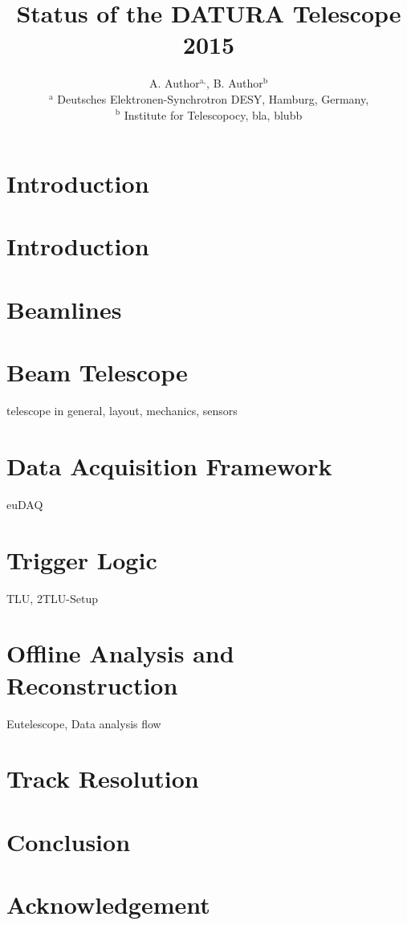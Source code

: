 \documentclass{JINST}
\title{Status of the DATURA Telescope 2015}
\author{A. Author${}^{\textrm{a},}$, B. Author${}^{\textrm{b}}$\\
${}^{\textrm{a}}$ Deutsches Elektronen-Synchrotron DESY, Hamburg, Germany,\\
${}^{\textrm{b}}$ Institute for Telescopocy, bla, blubb
}
\begin{document}
 \setpagewiselinenumbers
\modulolinenumbers[5]
\linenumbers

\normalsize

\section{Introduction}


\section{Introduction}

\section{Beamlines}

\section{Beam Telescope}
telescope in general, layout, mechanics, sensors

\section{Data Acquisition Framework}
euDAQ

\section{Trigger Logic}
TLU, 2TLU-Setup

\section{Offline Analysis and Reconstruction}
Eutelescope, Data analysis flow

\section{Track Resolution}

\section{Conclusion}

\section*{Acknowledgement}

\small


\end{document}

